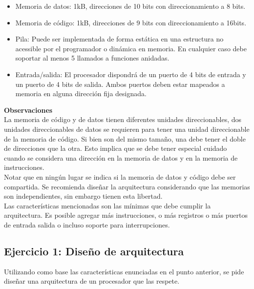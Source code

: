 \documentclass[a4paper,11pt]{article}
\begin{document}
\begin{itemize}
\item Memoria de datos: 1kB, direcciones de 10 bits con direccionamiento a 8 bits.

\item Memoria de código: 1kB, direcciones de 9 bits con direccionamiento a 16bits.

\item Pila: Puede ser implementada de forma estática en una estructura no acessible por el programador o dinámica en memoria.
En cualquier caso debe soportar al menos 5 llamados a funciones anidadas.

\item Entrada/salida: El procesador dispondrá de un puerto de 4 bits de entrada y un puerto de 4 bits de salida.
Ambos puertos deben estar mapeados a memoria en alguna dirección fija designada.

\end{itemize}

\noindent \textbf{Observaciones}\\

\indent La memoria de código y de datos tienen diferentes unidades direccionables, dos unidades direccionables de datos se requieren para tener una unidad direccionable de la memoria de código.
Si bien son del mismo tamaño, una debe tener el doble de direcciones que la otra.
Esto implica que se debe tener especial cuidado cuando se considera una dirección en la memoria de datos y en la memoria de instrucciones.\\
\indent Notar que en ningún lugar se indica si la memoria de datos y código debe ser compartida. Se recomienda diseñar la arquitectura considerando que las memorias son independientes, sin embargo tienen esta libertad.\\

Las características mencionadas son las mínimas que debe cumplir la arquitectura.
Es posible agregar más instrucciones, o más registros o más puertos de entrada salida o incluso soporte para interrupciones.

\subsection{Ejercicio 1: Diseño de arquitectura}

Utilizando como base las características enunciadas en el punto anterior, se pide diseñar una arquitectura de un procesador que las respete.
\end{document}
